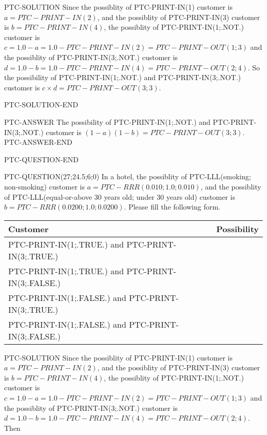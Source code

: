 \documentclass[12pt]{article}
\begin{document}
PTC-SOLUTION
Since the possiblity of PTC-PRINT-IN(1) customer is $ a = PTC-PRINT-IN(2) $,
and the possiblity of PTC-PRINT-IN(3) customer is $ b = PTC-PRINT-IN(4) $,
the possiblity of PTC-PRINT-IN(1;.NOT.) customer is $ c = 1.0 - a = 1.0 -
PTC-PRINT-IN(2)
= PTC-PRINT-OUT(1;3) $ and the possiblity of PTC-PRINT-IN(3;.NOT.)
customer is $ d = 1.0 - b = 1.0 - PTC-PRINT-IN(4) = PTC-PRINT-OUT(2;4)  $.
So the possibility of PTC-PRINT-IN(1;.NOT.) and PTC-PRINT-IN(3;.NOT.)
customer is $ c \times d = PTC-PRINT-OUT(3;3) $.

PTC-SOLUTION-END

PTC-ANSWER
The possibility of PTC-PRINT-IN(1;.NOT.) and PTC-PRINT-IN(3;.NOT.)
customer is $ (1-a)(1-b) = PTC-PRINT-OUT(3;3) $.
PTC-ANSWER-END

\vspace{0.3in}
PTC-QUESTION-END



PTC-QUESTION(27;24.5;6;0)
In a hotel, the possiblity of PTC-LLL(smoking; non-smoking) customer is
$a = PTC-RRR(0.010;1.0;0.010)$, and the possiblity of PTC-LLL(equal-or-above 30
years old; under 30 years old) customer is $ b = PTC-RRR(0.0200;1.0;0.0200)$.
Please fill the following form.

\noindent
 \begin{tabular}{|l|l|}
 \hline
         Customer & Possibility \\
 \hline
   PTC-PRINT-IN(1;.TRUE.)  and  PTC-PRINT-IN(3;.TRUE.)  & \\
 \hline
   PTC-PRINT-IN(1;.TRUE.)  and  PTC-PRINT-IN(3;.FALSE.) & \\
 \hline
   PTC-PRINT-IN(1;.FALSE.) and  PTC-PRINT-IN(3;.TRUE.)  & \\
 \hline
   PTC-PRINT-IN(1;.FALSE.) and PTC-PRINT-IN(3;.FALSE.) & \\
 \hline
 \end{tabular}



PTC-SOLUTION
Since the possiblity of PTC-PRINT-IN(1) customer is $ a = PTC-PRINT-IN(2) $,
and the possiblity of PTC-PRINT-IN(3) customer is $ b = PTC-PRINT-IN(4) $,
the possiblity of PTC-PRINT-IN(1;.NOT.) customer is $ c = 1.0 - a = 1.0 -
PTC-PRINT-IN(2)
= PTC-PRINT-OUT(1;3) $ and the possiblity of PTC-PRINT-IN(3;.NOT.)
customer is $ d = 1.0 - b = 1.0 - PTC-PRINT-IN(4) = PTC-PRINT-OUT(2;4)  $.
Then
\end{document}
